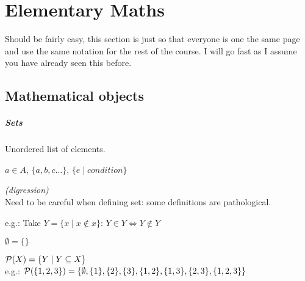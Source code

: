 \section{Elementary Maths}
Should be fairly easy, this section is just so that everyone is one the same page and use the same notation for the rest of the course.
I will go fast as I assume you have already seen this before.
\subsection{Mathematical objects}
\subparagraph{Sets}
\begin{definition}[Sets]
    Unordered list of elements.
\end{definition}
\begin{notation}[Sets]
    $a \in A$, $\{ a, b, c \dots \}$, $\{ e \mid condition \}$
\end{notation}
\begin{remark}
    \textit{(digression)}\\
    Need to be careful when defining set: some definitions are pathological.
    
    e.g.: Take $Y = \{x \mid x \not\in x\}$:
    $Y \in Y \iff Y \not\in Y$
\end{remark}

\begin{definition}
    $\emptyset = \{ \}$
\end{definition}
\begin{definition}
    $\mathcal{P}(X) = \{ Y \mid Y \subseteq X \}$\\
    e.g.: $\mathcal{P}(\{1,2,3\})=\{ \emptyset, \{1\},\{2\},\{3\}, \{1,2\},\{1,3\},\{2,3\}, \{1,2,3\} \}$
\end{definition}

